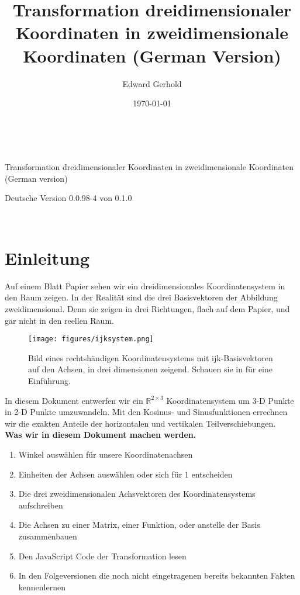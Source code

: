 \documentclass[a4paper]{article}
\begin{document}
\begin{center}
\title{Transformation dreidimensionaler Koordinaten in zweidimensionale Koordinaten (German Version)}\\
\author{Edward Gerhold}
Transformation dreidimensionaler Koordinaten in zweidimensionale Koordinaten (German version)\\
\date{\today}
\maketitle


Deutsche Version 0.0.98-4 von 0.1.0\\

\end{center} 

\tableofcontents\\

\section{Einleitung}

Auf einem Blatt Papier sehen wir ein dreidimensionales Koordinatensystem in den Raum zeigen.
In der Realit\"at sind die drei Basisvektoren der Abbildung zweidimensional. Denn sie zeigen 
in drei Richtungen, flach auf dem Papier, und gar nicht in den reellen Raum.\\

\begin{figure}[ht]
\label{ijksystem}
\texttt{[image: figures/ijksystem.png]}\\
\caption{Bild eines rechtsh\"andigen Koordinatensystems mit ijk-Basisvektoren auf den Achsen, in drei dimensionen zeigend. Schauen sie in \cite{Corral1} f\"ur eine Einf\"uhrung.}
\end{figure}

In diesem Dokument entwerfen wir ein $\mathbb{R}^{2\times{3}}$ Koordinatensystem um 3-D Punkte in 2-D Punkte umzuwandeln.
Mit den Kosinus- und Sinusfunktionen errechnen wir die exakten Anteile der horizontalen und vertikalen Teilverschiebungen.\\

\textbf{Was wir in diesem Dokument machen werden.}

\begin{enumerate}
\item Winkel ausw\"ahlen f\"ur unsere Koordinatenachsen 
\item Einheiten der Achsen ausw\"ahlen oder sich f\"ur $1$ entscheiden
\item Die drei zweidimensionalen Achsvektoren des Koordinatensystems aufschreiben
\item Die Achsen zu einer Matrix, einer Funktion, oder anstelle der Basis zusammenbauen
\item Den JavaScript Code der Transformation lesen
\item In den Folgeversionen die noch nicht eingetragenen bereits bekannten Fakten kennenlernen

\end{enumerate}
\end{document}
